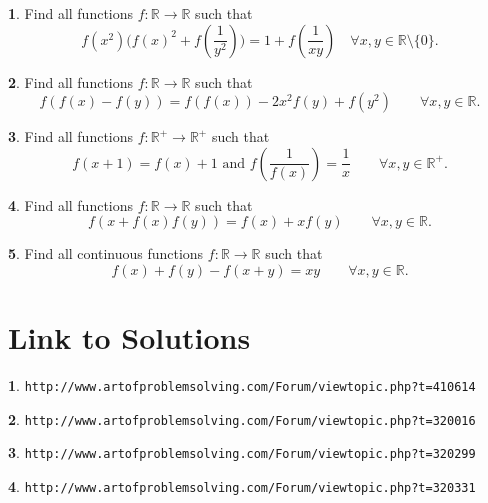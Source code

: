 \documentclass{article}
\theoremstyle{definition}
\newtheorem{p}{}
\newtheorem{s}{}
\begin{document}
\begin{p}
Find all functions $f : \mathbb R \to \mathbb R$ such that
\[f(x^2) \biggl( f(x)^2 + f\left( \frac{1}{y^2} \right) \biggr) = 1+f\left( \frac{1}{xy} \right) \quad \forall x,y \in \mathbb R \setminus\{0\} .\]
\end{p}



\begin{p}
Find all functions $ f: \mathbb{R}\to\mathbb{R}$ such that 
\[ f(f(x)-f(y))=f(f(x))-2x^2f(y)+f(y^2) \qquad \forall x,y \in \mathbb R.\]
\end{p}



\begin{p}
Find all functions $ f: \mathbb{R^+}\to\mathbb{R^+}$ such that 
\[ f(x+1)=f(x)+1 \text{ and } f\left(\frac{1}{f(x)}\right)=\frac{1}{x} \qquad \forall x,y \in \mathbb R^+.\]
\end{p}


\begin{p}
Find all functions $ f: \mathbb{R}\to\mathbb{R}$ such that 
\[ f(x+f(x)f(y))=f(x)+xf(y) \qquad \forall x,y \in \mathbb R.\]
\end{p}



\begin{p}
Find all continuous functions $f: \mathbb{R}\to\mathbb{R}$ such that 
\[f(x)+f(y)-f(x+y)=xy \qquad \forall x,y \in\mathbb{R}.\]
\end{p}

\newpage

\section{Link to Solutions}

\begin{s}
\texttt{http://www.artofproblemsolving.com/Forum/viewtopic.php?t=410614}
\end{s}

\begin{s}
\texttt{http://www.artofproblemsolving.com/Forum/viewtopic.php?t=320016}
\end{s}

\begin{s}
\texttt{http://www.artofproblemsolving.com/Forum/viewtopic.php?t=320299}
\end{s}

\begin{s}
\texttt{http://www.artofproblemsolving.com/Forum/viewtopic.php?t=320331}
\end{s}
\end{document}

